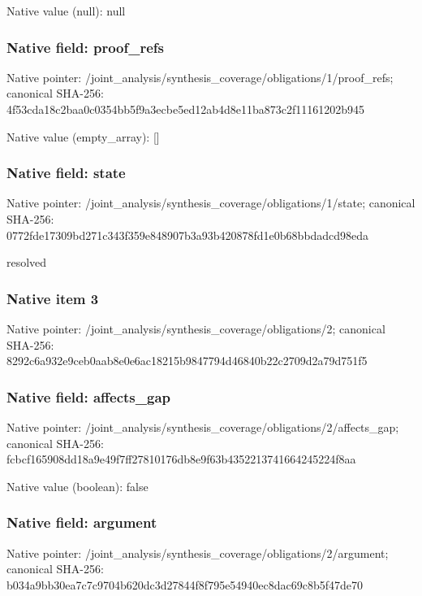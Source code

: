 \documentclass[10pt,a4paper]{article}
\begin{document}
Native value (null): null

\subsubsection{Native field: proof\_\allowbreak{}refs}
Native pointer: /joint\_\allowbreak{}analysis/synthesis\_\allowbreak{}coverage/obligations/1/proof\_\allowbreak{}refs; canonical SHA-256: 4f53cda18c2baa0c0354bb5f9a3ecbe5ed12ab4d8e11ba873c2f11161202b945

Native value (empty\_\allowbreak{}array): []

\subsubsection{Native field: state}
Native pointer: /joint\_\allowbreak{}analysis/synthesis\_\allowbreak{}coverage/obligations/1/state; canonical SHA-256: 0772fde17309bd271c343f359e848907b3a93b420878fd1e0b68bbdadcd98eda

\begingroup\raggedright\sloppy resolved\par\endgroup

\subsubsection{Native item 3}
Native pointer: /joint\_\allowbreak{}analysis/synthesis\_\allowbreak{}coverage/obligations/2; canonical SHA-256: 8292c6a932e9ceb0aab8e0e6ac18215b9847794d46840b22c2709d2a79d751f5

\subsubsection{Native field: affects\_\allowbreak{}gap}
Native pointer: /joint\_\allowbreak{}analysis/synthesis\_\allowbreak{}coverage/obligations/2/affects\_\allowbreak{}gap; canonical SHA-256: fcbcf165908dd18a9e49f7ff27810176db8e9f63b4352213741664245224f8aa

Native value (boolean): false

\subsubsection{Native field: argument}
Native pointer: /joint\_\allowbreak{}analysis/synthesis\_\allowbreak{}coverage/obligations/2/argument; canonical SHA-256: b034a9bb30ea7c7c9704b620dc3d27844f8f795e54940ec8dac69c8b5f47de70
\end{document}
